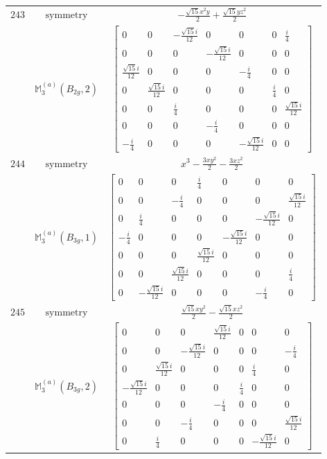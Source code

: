 \documentclass[fleqn,8pt,landscape]{jsarticle}
\begin{document}
\begin{longtable}{ccc}
$ 243 $ & $ \text{symmetry} $ & $ - \frac{\sqrt{15} x^{2} y}{2} + \frac{\sqrt{15} y z^{2}}{2} $ \\
$  $ & $ \mathbb{M}_{3}^{(a)}(B_{2g},2) $ & $ \begin{bmatrix} 0 & 0 & - \frac{\sqrt{15} i}{12} & 0 & 0 & 0 & \frac{i}{4} \\ 0 & 0 & 0 & - \frac{\sqrt{15} i}{12} & 0 & 0 & 0 \\ \frac{\sqrt{15} i}{12} & 0 & 0 & 0 & - \frac{i}{4} & 0 & 0 \\ 0 & \frac{\sqrt{15} i}{12} & 0 & 0 & 0 & \frac{i}{4} & 0 \\ 0 & 0 & \frac{i}{4} & 0 & 0 & 0 & \frac{\sqrt{15} i}{12} \\ 0 & 0 & 0 & - \frac{i}{4} & 0 & 0 & 0 \\ - \frac{i}{4} & 0 & 0 & 0 & - \frac{\sqrt{15} i}{12} & 0 & 0 \end{bmatrix} $ \\ \hline
$ 244 $ & $ \text{symmetry} $ & $ x^{3} - \frac{3 x y^{2}}{2} - \frac{3 x z^{2}}{2} $ \\
$  $ & $ \mathbb{M}_{3}^{(a)}(B_{3g},1) $ & $ \begin{bmatrix} 0 & 0 & 0 & \frac{i}{4} & 0 & 0 & 0 \\ 0 & 0 & - \frac{i}{4} & 0 & 0 & 0 & \frac{\sqrt{15} i}{12} \\ 0 & \frac{i}{4} & 0 & 0 & 0 & - \frac{\sqrt{15} i}{12} & 0 \\ - \frac{i}{4} & 0 & 0 & 0 & - \frac{\sqrt{15} i}{12} & 0 & 0 \\ 0 & 0 & 0 & \frac{\sqrt{15} i}{12} & 0 & 0 & 0 \\ 0 & 0 & \frac{\sqrt{15} i}{12} & 0 & 0 & 0 & \frac{i}{4} \\ 0 & - \frac{\sqrt{15} i}{12} & 0 & 0 & 0 & - \frac{i}{4} & 0 \end{bmatrix} $ \\ \hline
$ 245 $ & $ \text{symmetry} $ & $ \frac{\sqrt{15} x y^{2}}{2} - \frac{\sqrt{15} x z^{2}}{2} $ \\
$  $ & $ \mathbb{M}_{3}^{(a)}(B_{3g},2) $ & $ \begin{bmatrix} 0 & 0 & 0 & \frac{\sqrt{15} i}{12} & 0 & 0 & 0 \\ 0 & 0 & - \frac{\sqrt{15} i}{12} & 0 & 0 & 0 & - \frac{i}{4} \\ 0 & \frac{\sqrt{15} i}{12} & 0 & 0 & 0 & \frac{i}{4} & 0 \\ - \frac{\sqrt{15} i}{12} & 0 & 0 & 0 & \frac{i}{4} & 0 & 0 \\ 0 & 0 & 0 & - \frac{i}{4} & 0 & 0 & 0 \\ 0 & 0 & - \frac{i}{4} & 0 & 0 & 0 & \frac{\sqrt{15} i}{12} \\ 0 & \frac{i}{4} & 0 & 0 & 0 & - \frac{\sqrt{15} i}{12} & 0 \end{bmatrix} $ \\ \hline

\end{longtable}
\end{document}
